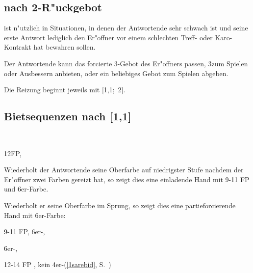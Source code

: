 \subsection{ nach 2\SA-R"uckgebot} \label{wolff}

 ist n"utzlich in Situationen, in denen der
Antwortende sehr schwach ist und seine erste Antwort lediglich den
Er"offner vor einem schlechten Treff- oder Karo-Kontrakt hat bewahren
sollen.

Der Antwortende kann das forcierte 3\kar-Gebot des Er"offners passen,
3\coe zum Spielen oder Ausbessern anbieten, oder ein beliebiges Gebot
zum Spielen abgeben.


Die Reizung beginnt jeweils mit [1\tre{}\sep1\pik;~2\SA{}].



%
%
\subsection{Bietsequenzen nach [1\tre{}\sep1\of{}]}

\bdsc
\item[1\tre{}\sep1\coe; ?]~
  \bdsc
  \item[1\pik] 12\pl FP, \nat

    Wiederholt der Antwortende seine Oberfarbe auf niedrigster Stufe
    nachdem der Er"offner zwei Farben gereizt hat, so zeigt dies eine
    einladende Hand mit 9-11 FP und 6er-Farbe.

    Wiederholt er seine Oberfarbe im Sprung, so zeigt dies eine
    partieforcierende Hand mit 6er-Farbe:
    \bdsc
    \item[2\coe] 9-11 FP, 6er-\co, \inv
    \item[3\coe] 6er-\co, \pf
    \edsc
  \item[1\SA] 12-14 FP \bal, kein 4er-\pi (\ra \ref{1sarebid},
S.~\pageref{1sarebid})
  \edsc

